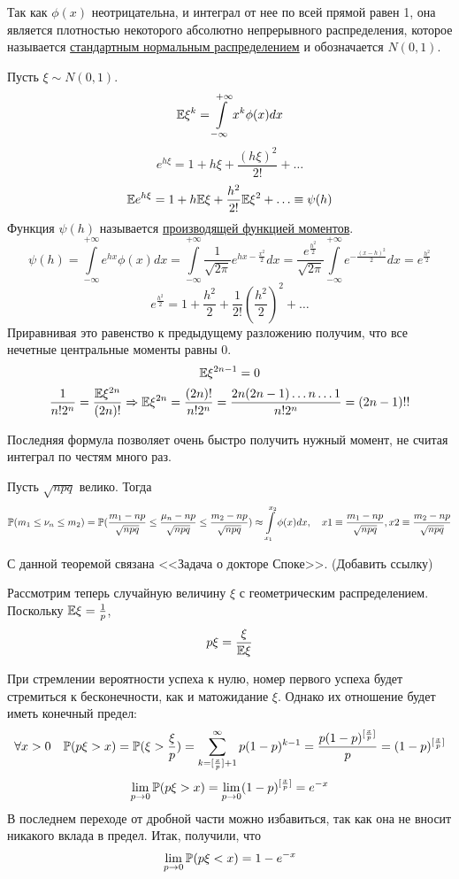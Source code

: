\documentclass[../TV&MS.tex]{subfiles}
\begin{document}
Так как $\phi(x)$ неотрицательна, и интеграл от нее по всей прямой равен 1, она является плотностью некоторого абсолютно непрерывного распределения, которое называется \underline{стандартным нормальным распределением} и обозначается $N(0, 1)$.

Пусть $\xi \sim N(0,1)$.
$$\mathbb{E}\xi^k = \int\limits_{-\infty}^{+\infty}x^k\phi(x)dx$$
$$e^{h\xi}=1 + h\xi + \frac{(h\xi)^2}{2!} + \ldots$$
$$\mathbb{E} e^{h\xi} = 1 + h\mathbb{E}\xi + \frac{h^2}{2!}\mathbb{E}\xi^2 + \ldots \equiv \psi(h)$$
Функция $\psi(h)$ называется \underline{производящей функцией моментов}.
$$\psi(h) = \int\limits_{-\infty}^{+\infty}e^{hx}\phi(x)dx = \int\limits_{-\infty}^{+\infty}\frac{1}{\sqrt{2\pi}}e^{hx-\frac{x^2}2}dx = \frac{e^{\frac{h^2}2}}{\sqrt{2\pi}}\int\limits_{-\infty}^{+\infty}e^{-\frac{(x-h)^2}2}dx = e^{\frac{h^2}2}$$
$$e^{\frac{h^2}2} = 1 + \frac{h^2}2 + \frac1{2!}(\frac{h^2}2)^2 + \ldots$$
Приравнивая это равенство к предыдущему разложению получим, что все нечетные центральные моменты равны 0.
$$\mathbb{E}\xi^{2n-1} = 0$$
$$\frac{1}{n!2^n} = \frac{\mathbb{E}\xi^{2n}}{(2n)!} \Rightarrow \mathbb{E}\xi^{2n} = \frac{(2n)!}{n!2^n} = \frac{2n(2n-1)\ldots n \ldots 1}{n!2^n} = (2n-1)!!$$

Последняя формула позволяет очень быстро получить нужный момент, не считая интеграл по честям много раз.

\begin{Th}
Пусть $\sqrt{npq}$ велико. Тогда
$$\mathbb{P}(m_1 \le \nu_n \le m_2) = \mathbb{P}(\frac{m_1 - np}{\sqrt{npq}} \le \frac{\mu_n - np}{\sqrt{npq}} \le \frac{m_2 - np}{\sqrt{npq}}) \approx \int\limits_{x_1}^{x_2}\phi(x)dx, \quad x1 \equiv \frac{m_1 - np}{\sqrt{npq}}, x2 \equiv\frac{m_2 - np}{\sqrt{npq}}$$
\end{Th}

С данной теоремой связана <<Задача о докторе Споке>>. (Добавить ссылку)

Рассмотрим теперь случайную величину $\xi$ с геометрическим распределением. Поскольку $\mathbb{E}\xi = \frac1p$, 
$$p\xi=\frac{\xi}{\mathbb{E}\xi}$$

При стремлении вероятности успеха к нулю, номер первого успеха будет стремиться к бесконечности, как и матожидание $\xi$. Однако их отношение будет иметь конечный предел:
$$\forall x > 0 \quad \mathbb{P}(p\xi > x) = \mathbb{P}(\xi > \frac{\xi}p) = \sum\limits_{k = [\frac{x}{p}] + 1}^{\infty}p(1-p)^{k-1} = \frac{p(1-p)^{[\frac{x}p]}}p = (1-p)^{[\frac{x}p]}$$ 
$$\lim\limits_{p \to 0} \mathbb{P}(p\xi > x) = \lim\limits_{p \to 0}(1-p)^{[\frac{x}p]} = e^{-x}$$
В последнем переходе от дробной части можно избавиться, так как она не вносит никакого вклада в предел.
Итак, получили, что
$$\lim\limits_{p \to 0} \mathbb{P}(p\xi < x) = 1 - e^{-x}$$
\end{document}
